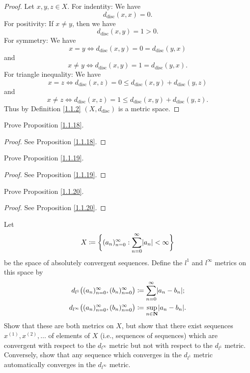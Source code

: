 \begin{proof}
    Let \(x, y, z \in X\).
    For indentity:
    We have
    \[
        d_{\text{disc}}(x, x) = 0.
    \]
    For positivity:
    If \(x \neq y\), then we have
    \[
        d_{\text{disc}}(x, y) = 1 > 0.
    \]
    For symmetry:
    We have
    \[
        x = y \iff d_{\text{disc}}(x, y) = 0 = d_{\text{disc}}(y, x)
    \]
    and
    \[
        x \neq y \iff d_{\text{disc}}(x, y) = 1 = d_{\text{disc}}(y, x).
    \]
    For triangle inequality:
    We have
    \[
        x = z \iff d_{\text{disc}}(x, z) = 0 \leq d_{\text{disc}}(x, y) + d_{\text{disc}}(y, z)
    \]
    and
    \[
        x \neq z \iff d_{\text{disc}}(x, z) = 1 \leq d_{\text{disc}}(x, y) + d_{\text{disc}}(y, z).
    \]
    Thus by Definition \ref{1.1.2} \((X, d_{\text{disc}})\) is a metric space.
\end{proof}

\begin{exercise}\label{ex 1.1.12}
    Prove Proposition \ref{1.1.18}.
\end{exercise}

\begin{proof}
    See Proposition \ref{1.1.18}.
\end{proof}

\begin{exercise}\label{ex 1.1.13}
    Prove Proposition \ref{1.1.19}.
\end{exercise}

\begin{proof}
    See Proposition \ref{1.1.19}.
\end{proof}

\begin{exercise}\label{ex 1.1.14}
    Prove Proposition \ref{1.1.20}.
\end{exercise}

\begin{proof}
    See Proposition \ref{1.1.20}.
\end{proof}

\begin{exercise}\label{ex 1.1.15}
    Let
    \[
        X \coloneqq \bigg\{(a_n)_{n = 0}^\infty : \sum_{n = 0}^\infty \abs*{a_n} < \infty\bigg\}
    \]
    be the space of absolutely convergent sequences. Define the \(l^1\) and \(l^\infty\) metrics
    on this space by
    \begin{align*}
        d_{l^1}\big((a_n)_{n = 0}^\infty, (b_n)_{n = 0}^\infty\big)      & \coloneqq \sum_{n = 0}^\infty \abs*{a_n - b_n};     \\
        d_{l^\infty}\big((a_n)_{n = 0}^\infty, (b_n)_{n = 0}^\infty\big) & \coloneqq \sup_{n \in \mathbf{N}} \abs*{a_n - b_n}.
    \end{align*}
    Show that these are both metrics on \(X\), but show that there exist sequences \(x^{(1)}, x^{(2)}, \dots\) of elements of \(X\) (i.e., sequences of sequences) which are convergent with respect to the \(d_{l^\infty}\) metric but not with respect to the \(d_{l^1}\) metric.
    Conversely, show that any sequence which converges in the \(d_{l^1}\) metric automatically converges in the \(d_{l^\infty}\) metric.
\end{exercise}

